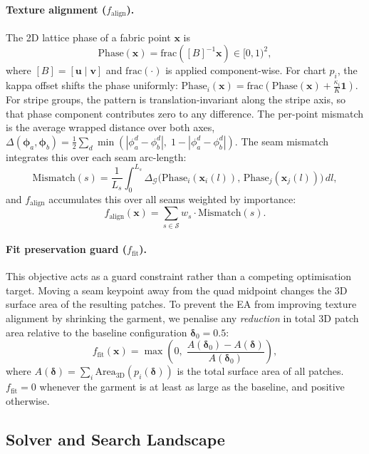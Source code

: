 \paragraph{Texture alignment ($f_\text{align}$).}
The 2D lattice phase of a fabric point $\mathbf{x}$ is
\[
\mathrm{Phase}(\mathbf{x}) = \mathrm{frac}([B]^{-1}\mathbf{x}) \in [0,1)^2,
\]
where $[B] = [\mathbf{u} \mid \mathbf{v}]$ and $\mathrm{frac}(\cdot)$ is
applied component-wise.
For chart $p_i$, the kappa offset shifts the phase uniformly:
$\mathrm{Phase}_i(\mathbf{x}) =
\mathrm{frac}(\mathrm{Phase}(\mathbf{x}) + \frac{\kappa_i}{K}\mathbf{1})$.
For stripe groups, the pattern is translation-invariant along the stripe axis,
so that phase component contributes zero to any difference.
The per-point mismatch is the average wrapped distance over both axes,
$\Delta(\boldsymbol{\phi}_a, \boldsymbol{\phi}_b)
= \tfrac{1}{2}\sum_{d} \min(|\phi_a^d - \phi_b^d|,\; 1 - |\phi_a^d - \phi_b^d|)$.
The seam mismatch integrates this over each seam arc-length:
\[
\mathrm{Mismatch}(s)
= \frac{1}{L_s} \int_0^{L_s}
  \Delta_{\mathcal{G}}\!\bigl(
    \mathrm{Phase}_i(\mathbf{x}_i(l)),\,
    \mathrm{Phase}_j(\mathbf{x}_j(l))
  \bigr)\, dl,
\]
and $f_\text{align}$ accumulates this over all seams weighted by importance:
\[
f_\text{align}(\mathbf{x}) = \sum_{s \in \mathcal{S}} w_s \cdot \mathrm{Mismatch}(s).
\]

\paragraph{Fit preservation guard ($f_\text{fit}$).}
This objective acts as a guard constraint rather than a competing
optimisation target.
Moving a seam keypoint away from the quad midpoint changes the 3D surface
area of the resulting patches.
To prevent the EA from improving texture alignment by shrinking the garment,
we penalise any \emph{reduction} in total 3D patch area relative to the
baseline configuration $\boldsymbol{\delta}_0 = 0.5$:
\[
f_\text{fit}(\mathbf{x})
= \max\!\left(0,\;
  \frac{A(\boldsymbol{\delta}_0) - A(\boldsymbol{\delta})}{A(\boldsymbol{\delta}_0)}
  \right),
\]
where $A(\boldsymbol{\delta}) = \sum_i \mathrm{Area}_{\mathrm{3D}}(p_i(\boldsymbol{\delta}))$
is the total surface area of all patches.
$f_\text{fit} = 0$ whenever the garment is at least as large as the baseline,
and positive otherwise.

\subsection{Solver and Search Landscape}
\label{sec:ea}

